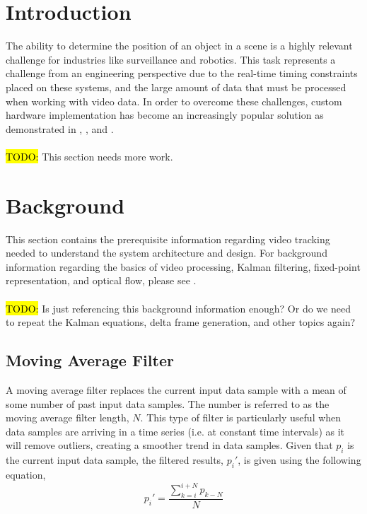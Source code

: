 \documentclass[11pt]{article} %
\begin{document}
\section{Introduction}
The ability to determine the position of an object in a scene is a highly relevant challenge for industries like surveillance and robotics. This task represents a challenge from an engineering perspective due to the real-time timing constraints placed on these systems, and the large amount of data that must be processed when working with video data. In order to overcome these challenges, custom hardware implementation has become an increasingly popular solution as demonstrated in \cite{1}, \cite{2}, and \cite{3}. \\\\
\hl{TODO:} This section needs more work.
\section{Background}
This section contains the prerequisite information regarding video tracking needed to understand the system architecture and design. For background information regarding the basics of video processing, Kalman filtering, fixed-point representation, and optical flow, please see \cite{phase1}. \\\\
\hl{TODO:} Is just referencing this background information enough? Or do we need to repeat the Kalman equations, delta frame generation, and other topics again?
\subsection{Moving Average Filter}
\label{sec:filter}
A moving average filter replaces the current input data sample with a mean of some number of past input data samples. The number is referred to as the moving average filter length, $N$. This type of filter is particularly useful when data samples are arriving in a time series (i.e. at constant time intervals) as it will remove outliers, creating a smoother trend in data samples. Given that $p_i$ is the current input data sample, the filtered results, $p_i'$, is given using the following equation,
\begin{equation}
p_i' = \frac{\sum_{k = i}^{i + N} p_{k-N}}{N}
\end{equation}
\end{document}
